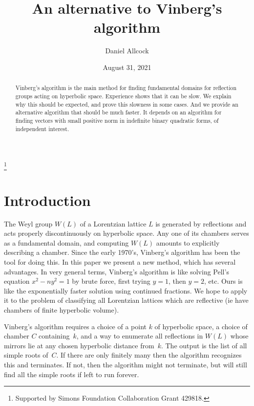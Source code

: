 \documentclass[12pt]{amsart}
\numberwithin{theorem}{section}
\numberwithin{equation}{section}
\numberwithin{figure}{section}
\theoremstyle{remark}
\begin{document}
\title[]{An alternative to Vinberg's algorithm}
%
\author{Daniel Allcock}
\thanks{Supported by Simons Foundation Collaboration Grant 429818.}
\address{Department of Mathematics\\University of Texas, Austin}
%
\date{August 31, 2021}

\begin{abstract}
    Vinberg's algorithm is the main method for finding
    fundamental domains for reflection groups acting
    on hyperbolic space.  Experience shows that it can
    be slow.  We explain why this should be expected,  and
    prove this slowness in some cases.  And we provide an
    alternative algorithm that should be much faster.
    It depends on an algorithm for finding vectors
    with small positive norm 
    in indefinite binary quadratic forms, of independent
    interest.
\end{abstract}

\maketitle

\section{Introduction}
\label{sec-introduction}

\noindent
The Weyl group $W(L)$ of a Lorentzian lattice $L$ 
is generated by reflections and acts
properly discontinuously on hyperbolic space.
Any one of its chambers serves as a fundamental domain, and 
computing $W(L)$ amounts to explicitly describing a chamber.
Since the early 1970's, Vinberg's algorithm has been the 
tool for doing this.  In this paper we present a new
method, which has several advantages.
In very general terms, Vinberg's algorithm is like
solving Pell's equation
$x^2-ny^2=1$ by brute force, first trying $y=1$, then $y=2$, etc.
 Ours is like the exponentially faster
solution using continued fractions.
We hope to apply it to the problem of classifying all
Lorentzian lattices which are reflective (ie have
chambers of finite hyperbolic volume).

Vinberg's algorithm requires a choice of a point $k$ of hyperbolic
space,
a choice of chamber $C$ containing~$k$,
and a way to enumerate all reflections in $W(L)$
whose mirrors lie at any chosen hyperbolic distance from~$k$.  The output
is the list of all simple roots of~$C$.  If there are only
finitely many then the algorithm recognizes this and terminates.
If not, then
the algorithm might not terminate, but will still find all
the simple roots
if left to run forever.
\end{document}
